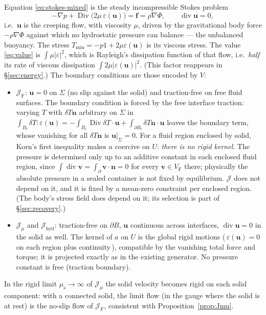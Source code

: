 \documentclass[11pt]{article}
\newcommand{\Jf}{\mathscr{J}}  %
\newcommand{\eps}{\varepsilon}
\newcommand{\Bf}{B_{\mathrm{f}}}
\newcommand{\bu}{\mathbf{u}}
\newcommand{\bv}{\mathbf{v}}
\newcommand{\bn}{\mathbf{n}}
\newcommand{\bff}{\mathbf{f}}
\newcommand{\Div}{\operatorname{Div}}
\renewcommand{\div}{\operatorname{div}}
\newcommand{\JF}{\Jf _{\mathrm{F}}}
\newcommand{\Jmu}{\Jf _{\mu}}
\newcommand{\Jh}{\Jf _{\mathrm{hyd}}}
\begin{document}
Equation \eqref{eq:stokes-mixed} is the steady incompressible Stokes
problem
\begin{equation}
  -\nabla p + \Div\bigl(2\mu\,\eps(\bu)\bigr) = \bff = \rho\nabla\Phi ,
  \qquad \div\bu = 0 ,
  \label{eq:stokes-strong}
\end{equation}
i.e.\ $\bu$ is the creeping flow, with viscosity $\mu$, driven by the
gravitational body force $-\rho\nabla\Phi$ against which no hydrostatic
pressure can balance --- the unbalanced buoyancy. The stress
$T_{\min} = -p1 + 2\mu\eps(\bu)$ is its viscous stress. The value
\eqref{eq:value} is $\int\mu|\eps|^2$, which is Rayleigh's dissipation
function of that flow, i.e.\ \emph{half} its rate of viscous
dissipation $\int 2\mu|\eps(\bu)|^2$. (This factor reappears in
\S\ref{sec:energy}.) The boundary conditions are those encoded by $V$:
\begin{itemize}
\item $\JF$: $\bu = 0$ on $\Sigma$ (no slip against the solid) and
  traction-free on free fluid surfaces. The boundary condition is forced
  by the free interface traction: varying $T$ with $\delta T\bn$
  arbitrary on $\Sigma$ in $\int_{\Bf}\delta T:\eps(\bu) = -\int_{\Bf}
  \Div\delta T\cdot\bu + \int_{\partial\Bf}\delta T\bn\cdot\bu$ leaves the
  boundary term, whose vanishing for all $\delta T\bn$ is $\bu|_\Sigma = 0$.
  For a fluid region enclosed by solid, Korn's first inequality makes $a$
  coercive on $U$: \emph{there is no rigid kernel}. The pressure is
  determined only up to an additive constant in each enclosed fluid
  region, since $\int\div\bv = \int_{\partial}\bv\cdot\bn = 0$ for every
  $\bv\in V_{\mathrm{F}}$ there; physically the absolute pressure in a
  sealed container is not fixed by equilibrium. $\Jf $ does not depend on it,
  and it is fixed by a mean-zero constraint per enclosed region. (The
  body's stress field does depend on it; its selection is part of
  \S\ref{sec:recovery}.)
\item $\Jmu$ and $\Jh$: traction-free on $\partial B$, $\bu$ continuous
  across interfaces, $\div\bu = 0$ in the solid as well. The kernel of
  $a$ on $U$ is the global rigid motions (\,$\eps(\bu)=0$ on each region
  plus continuity\,), compatible by the vanishing total force and torque;
  it is projected exactly as in the existing generator. No pressure
  constant is free (traction boundary).
\end{itemize}
In the rigid limit $\mu_{\mathrm{s}}\to\infty$ of $\Jmu$ the solid
velocity becomes rigid on each solid component: with a connected solid,
the limit flow (in the gauge where the solid is at rest) is the no-slip
flow of $\JF$, consistent with Proposition~\ref{prop:Jmu}.
\end{document}
